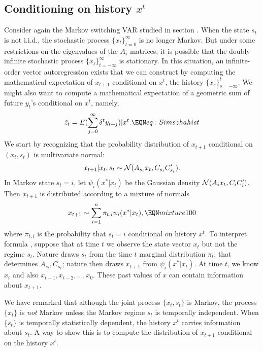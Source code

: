 \subsection{Conditioning on  history  $x^t$}
Consider again the Markov switching VAR studied in section . 
When the state $s_t$ is not i.i.d., the stochastic process $\{x_t\}_{t=0}^\infty$ is no longer Markov.
But  under some restrictions on the eigenvalues of the $A_i$ matrices, it is possible that the doubly infinite  stochastic process $\{x_t\}_{t=-\infty}^\infty$ is  stationary. 
In this situation,   an infinite-order vector autoregression exists that we can construct by computing the mathematical expectation of $x_{t+1}$ conditional
on $x^t$, the history $\{x_s\}_{s=-\infty}^t$. %
We might also want to  compute a mathematical expectation of a geometric sum of future
$y_t$'s conditional on $x^t$, namely, 
$$ \tilde z_t =  E ( \sum_{j=0}^\infty \delta^t y_{t+j} ) | x^t . \EQN eq:Simszhahist $$ 
 We start by recognizing that the probability distribution of $x_{t+1}$  conditional on $(x_t, s_t)$ is multivariate normal:
$$  x_{t+1} | x_t, s_t   \sim {\cal N}( A_{s_t} x_t, C_{s_t}C_{s_t} ' ) . $$
In Markov state
$s_t = i$, let $\psi_i(x^*| x_t)$ be the Gaussian density  ${\cal N}( A_i x_t, C_{i}C_{i} ' )$.  
Then  $x_{t+1}$ is distributed according to  a mixture of normals
$$  x_{t+1}  \sim \sum_{i=1}^n \pi_{t,i} \psi_i(x^* | x_t) , \EQN mixture100  $$
where $\pi_{t,i}$ is the   probability  that  $s_t =i $ conditional on history $x^t$.  To interpret
formula , suppose that 
at time $t$  we observe the state vector  $x_t$ but not  the regime $s_t$.
Nature  draws $s_t$ from the time $t$ marginal distribution $\pi_t$; that determines    $A_{s_t}, C_{s_t}$;
nature   
then draws   $x_{t+1}$ from $ \psi_i(x^* | x_t)$. 
At time $t$,   we know  $x_t$ and also   $x_{t-1}, x_{t-2}, \ldots, x_0$.
These  past values of $x$  can 
 contain  information about   $x_{t+1}$. %

We have remarked  that although  the joint process $\{x_t, s_t\}$ is 
 Markov,  the process $\{x_t\}$ is {\it not} Markov unless the Markov regime $s_t$ is temporally independent. When $\{s_t\}$ is temporally statistically dependent,
the history  
$x^t$ %
 carries information about $s_t$.  
   A  way to show this
is to compute the distribution of $x_{t+1}$ conditional on the history $x^t$.   
 
